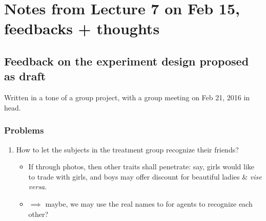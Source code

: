 
\section{Notes from Lecture 7 on Feb 15, feedbacks + thoughts }

\subsection{Feedback on the experiment design proposed as draft}
Written in a tone of a group project, with a group meeting on Feb 21, 2016 in
head.

\subsubsection{Problems}

\begin{enumerate}
    \item How to let the subjects in the treatment group recognize their
        friends?
        \begin{itemize}
            \item If through photos, then other traits shall penetrate: say,
                girls would like to trade with girls, and boys may offer
                discount for beautiful ladies \& \textit{vise versa}.
            \item $\implies$ maybe, we may use the real names to
                for agents to recognize each other?


\end{itemize}
\end{enumerate}
